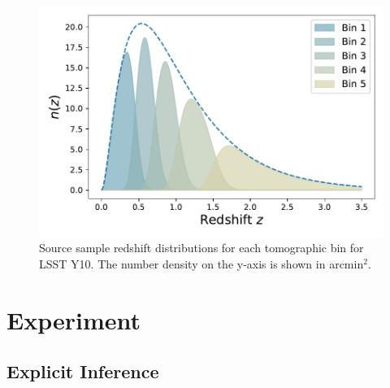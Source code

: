 \documentclass{aa}
\begin{document}
\begin{figure}
    \centering
    \includegraphics[width=\columnwidth]{figures/redshift_distribution_light.pdf}
    \caption{
     Source sample redshift distributions for each tomographic bin for LSST Y10. The number density on the y-axis is shown in arcmin$^2$.
    }
     \label{fig:redshift_distribution}
\end{figure}
\section{Experiment}
\subsection{Explicit Inference}
\end{document}
